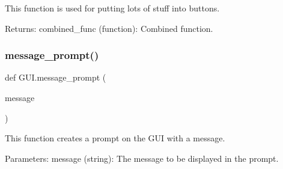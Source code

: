 \begin{DoxyVerb}This function is used for putting lots of stuff into buttons.

Returns:
    combined_func (function): Combined function.
\end{DoxyVerb}
 \mbox{\label{namespace_g_u_i_aae078fdef2bd79cc7c7c1f2a917c18b1}} 
\subsubsection{\texorpdfstring{message\_prompt()}{message\_prompt()}}
{\footnotesize\ttfamily def G\+U\+I.\+message\+\_\+prompt (\begin{DoxyParamCaption}\item[{}]{message }\end{DoxyParamCaption})}

\begin{DoxyVerb}This function creates a prompt on the GUI with a message.

Parameters:
    message (string): The message to be displayed in the prompt.
\end{DoxyVerb}
 